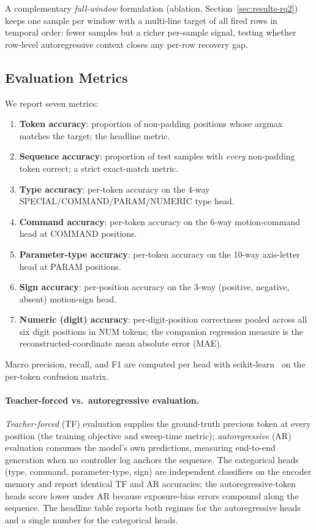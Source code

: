 \documentclass[sensors,article,submit,moreauthors,pdftex]{Definitions/mdpi}
\begin{document}
A complementary \emph{full-window} formulation (ablation, Section~\ref{sec:results-rq2}) keeps one sample per window with a multi-line target of all fired rows in temporal order: fewer samples but a richer per-sample signal, testing whether row-level autoregressive context closes any per-row recovery gap.

\subsection{Evaluation Metrics}
\label{sec:metrics}

We report seven metrics:

\begin{enumerate}
\item \textbf{Token accuracy}: proportion of non-padding positions whose argmax matches the target; the headline metric.
\item \textbf{Sequence accuracy}: proportion of test samples with \emph{every} non-padding token correct; a strict exact-match metric.
\item \textbf{Type accuracy}: per-token accuracy on the 4-way SPECIAL/COMMAND/PARAM/NUMERIC type head.
\item \textbf{Command accuracy}: per-token accuracy on the 6-way motion-command head at COMMAND positions.
\item \textbf{Parameter-type accuracy}: per-token accuracy on the 10-way axis-letter head at PARAM positions.
\item \textbf{Sign accuracy}: per-position accuracy on the 3-way (positive, negative, absent) motion-sign head.
\item \textbf{Numeric (digit) accuracy}: per-digit-position correctness pooled across all six digit positions in NUM tokens; the companion regression measure is the reconstructed-coordinate mean absolute error (MAE).
\end{enumerate}

Macro precision, recall, and F1 are computed per head with scikit-learn~\cite{pedregosa2011sklearn} on the per-token confusion matrix.

\paragraph{Teacher-forced vs.\ autoregressive evaluation.} \emph{Teacher-forced} (TF) evaluation supplies the ground-truth previous token at every position (the training objective and sweep-time metric); \emph{autoregressive} (AR) evaluation consumes the model's own predictions, measuring end-to-end generation when no controller log anchors the sequence. The categorical heads (type, command, parameter-type, sign) are independent classifiers on the encoder memory and report identical TF and AR accuracies; the autoregressive-token heads score lower under AR because exposure-bias errors compound along the sequence. The headline table reports both regimes for the autoregressive heads and a single number for the categorical heads.
\end{document}

